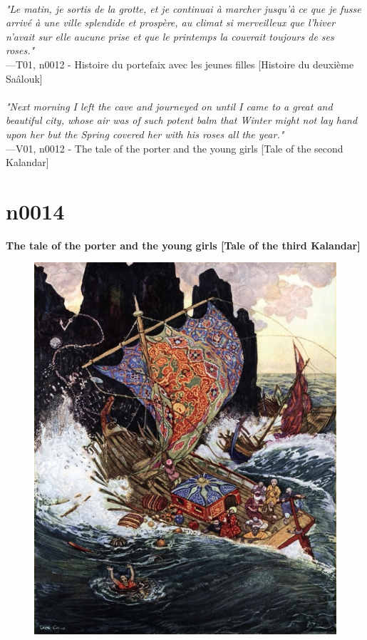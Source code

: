 \documentclass[../Carre_nights.tex]{subfiles}
\begin{document}
\textit{\\
"Le matin, je sortis de la grotte, et je continuai à marcher jusqu’à ce que je fusse arrivé à une ville splendide et prospère, au climat si merveilleux que l’hiver n’avait sur elle aucune prise et que le printemps la couvrait toujours de ses roses."} \\
—T01, n0012 - Histoire du portefaix avec les jeunes filles [Histoire du deuxième Saâlouk] \\~\\
\textit{"Next morning I left the cave and journeyed on until I came to a great and beautiful city, whose air was of such potent balm that Winter might not lay hand upon her but the Spring covered her with his roses all the year."} \\
—V01, n0012 - The tale of the porter and the young girls [Tale of the second Kalandar]

\newpage

\section{n0014}
\textbf{\Large{The tale of the porter and the young girls [Tale of the third Kalandar]}} \\

\begin{figure}[ht]
\centering
\includegraphics[height=\figsize]{illustrations/volume_1/T01, n0014 - Histoire du portefaix avec les jeunes filles [Histoire du troisième Saâlouk].jpg}
\end{figure}
\end{document}
